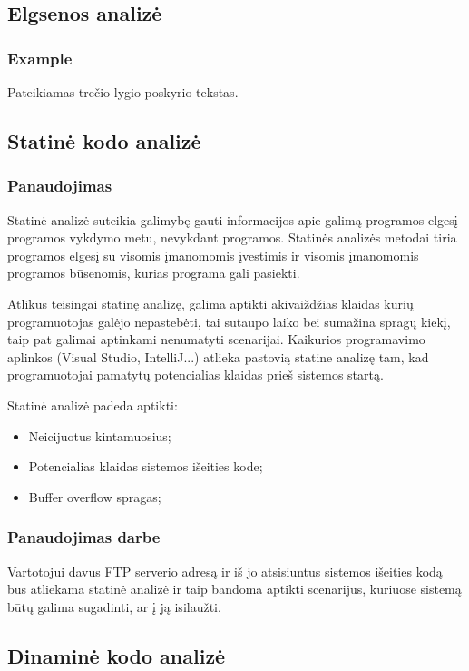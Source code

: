 \documentclass[a4paper,12pt,fleqn]{article}
\begin{document}
\subsection{Elgsenos analizė}
\label{sec:example}

\subsubsection{Example}
\label{sec:data}
Pateikiamas trečio lygio poskyrio tekstas.


\subsection{Statinė kodo analizė}
\label{sec:example}


\subsubsection{Panaudojimas}
\label{sec:data}
Statinė analizė suteikia galimybę gauti informacijos apie galimą programos elgesį programos vykdymo metu, nevykdant programos.
Statinės analizės metodai tiria programos elgesį su visomis įmanomomis įvestimis ir visomis įmanomomis programos būsenomis, kurias programa gali pasiekti.

Atlikus teisingai statinę analizę, galima aptikti akivaiždžias klaidas kurių programuotojas galėjo nepastebėti, tai sutaupo laiko bei sumažina spragų kiekį, taip pat galimai aptinkami nenumatyti scenarijai. Kaikurios programavimo aplinkos (Visual Studio, IntelliJ...) atlieka pastovią statine analizę tam, kad programuotojai pamatytų potencialias klaidas prieš sistemos startą.

Statinė analizė padeda aptikti:
\begin{itemize}
	\item Neicijuotus kintamuosius;
	\item Potencialias klaidas sistemos išeities kode;
	\item Buf{}fer overflow spragas;
\end{itemize}

\subsubsection{Panaudojimas darbe}
\label{sec:data}
Vartotojui davus FTP serverio adresą ir iš jo atsisiuntus sistemos išeities kodą bus atliekama statinė analizė ir taip bandoma aptikti scenarijus, kuriuose sistemą būtų galima sugadinti, ar į ją isilaužti. 
\subsection{Dinaminė kodo analizė}
\label{sec:example}
\end{document}
